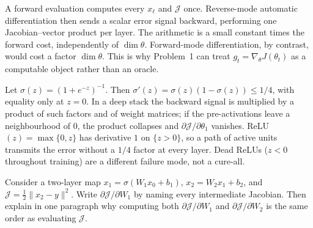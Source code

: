 \begin{remark}
\label{rem:dlu-reverse-mode}
A forward evaluation computes every \(x_\ell\) and \(\mathcal{J}\) once. Reverse-mode automatic differentiation then sends a scalar error signal backward, performing one Jacobian--vector product per layer. The arithmetic is a small constant times the forward cost, independently of \(\dim\theta\). Forward-mode differentiation, by contrast, would cost a factor \(\dim\theta\). This is why Problem~1 can treat \(g_t=\nabla_\theta J(\theta_t)\) as a computable object rather than an oracle.
\end{remark}

\begin{proposition}
\label{prop:dlu-vanish}
Let \(\sigma(z)=(1+e^{-z})^{-1}\). Then \(\sigma'(z)=\sigma(z)(1-\sigma(z))\le 1/4\), with equality only at \(z=0\). In a deep stack the backward signal is multiplied by a product of such factors and of weight matrices; if the pre-activations leave a neighbourhood of \(0\), the product collapses and \(\partial\mathcal{J}/\partial\theta_1\) vanishes. ReLU\((z)=\max\{0,z\}\) has derivative \(1\) on \(\{z>0\}\), so a path of active units transmits the error without a \(1/4\) factor at every layer. Dead ReLUs (\(z<0\) throughout training) are a different failure mode, not a cure-all.
\end{proposition}

\begin{exercise}
\label{ex:dlu-chain}
Consider a two-layer map \(x_1=\sigma(W_1 x_0+b_1)\), \(x_2=W_2 x_1+b_2\), and \(\mathcal{J}=\frac12\|x_2-y\|^2\). Write \(\partial\mathcal{J}/\partial W_1\) by naming every intermediate Jacobian. Then explain in one paragraph why computing both \(\partial\mathcal{J}/\partial W_1\) and \(\partial\mathcal{J}/\partial W_2\) is the same order as evaluating \(\mathcal{J}\).
\end{exercise}

